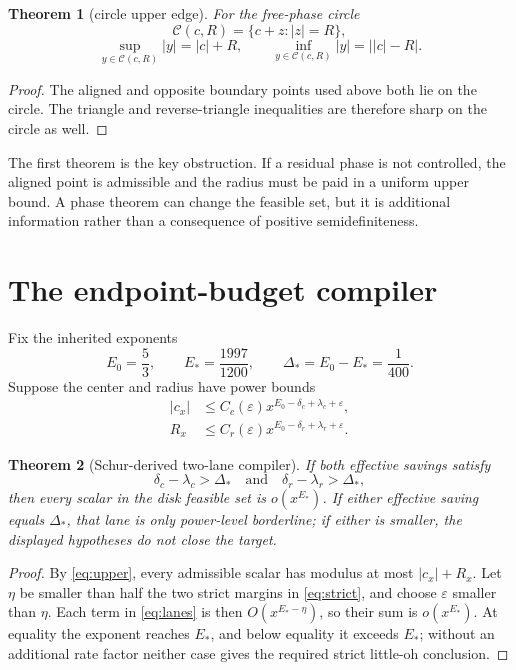\documentclass[11pt]{article}
\newtheorem{theorem}{Theorem}
\theoremstyle{definition}
\begin{document}
\begin{theorem}[circle upper edge]
For the free-phase circle
\[
 \mathcal C(c,R)=\{c+z:|z|=R\},
\]
\[
 \sup_{y\in\mathcal C(c,R)}|y|=|c|+R,
 \qquad
 \inf_{y\in\mathcal C(c,R)}|y|=\bigl||c|-R\bigr|.
\]
\end{theorem}

\begin{proof}
The aligned and opposite boundary points used above both lie on the circle.
The triangle and reverse-triangle inequalities are therefore sharp on the
circle as well.
\end{proof}

The first theorem is the key obstruction.  If a residual phase is not
controlled, the aligned point is admissible and the radius must be paid in a
uniform upper bound.  A phase theorem can change the feasible set, but it is
additional information rather than a consequence of positive semidefiniteness.

\section{The endpoint-budget compiler}

Fix the inherited exponents
\[
 E_0=\frac53,\qquad E_*=\frac{1997}{1200},\qquad
 \Delta_*=E_0-E_* = \frac1{400}.
\]
Suppose the center and radius have power bounds
\begin{align}
 |c_x|&\leq C_c(\varepsilon)x^{E_0-\delta_c+\lambda_c+\varepsilon},\\
 R_x&\leq C_r(\varepsilon)x^{E_0-\delta_r+\lambda_r+\varepsilon}.
 \label{eq:lanes}
\end{align}

\begin{theorem}[Schur-derived two-lane compiler]
If both effective savings satisfy
\[
 \delta_c-\lambda_c>\Delta_*\quad\text{and}\quad
 \delta_r-\lambda_r>\Delta_* ,
 \label{eq:strict}
\]
then every scalar in the disk feasible set is $o(x^{E_*})$.  If either
effective saving equals $\Delta_*$, that lane is only power-level borderline;
if either is smaller, the displayed hypotheses do not close the target.
\end{theorem}

\begin{proof}
By \eqref{eq:upper}, every admissible scalar has modulus at most
$|c_x|+R_x$.  Let $\eta$ be smaller than half the two strict margins in
\eqref{eq:strict}, and choose $\varepsilon$ smaller than $\eta$.  Each term
in \eqref{eq:lanes} is then $O(x^{E_*-\eta})$, so their sum is
$o(x^{E_*})$.  At equality the exponent reaches $E_*$, and below equality it
exceeds $E_*$; without an additional rate factor neither case gives the
required strict little-oh conclusion.
\end{proof}
\end{document}
